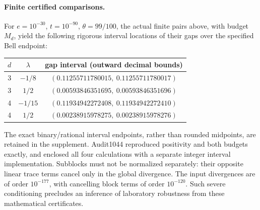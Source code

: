 \paragraph{Finite certified comparisons.}
For \(e=10^{-30}\), \(t=10^{-90}\), \(\theta=99/100\), the actual finite pairs above, with budget \(M_d\), yield the following rigorous interval locations of their gaps over the specified Bell endpoint:
\begin{center}
\begin{tabular}{ccc}
\toprule
\(d\)&\(\lambda\)&gap interval (outward decimal bounds)\\
\midrule
3&\(-1/8\)&\((0.11255711780015,\ 0.11255711780017)\)\\
3&\(1/2\)&\((0.00593846351695,\ 0.00593846351696)\)\\
4&\(-1/15\)&\((0.11934942272408,\ 0.11934942272410)\)\\
4&\(1/2\)&\((0.00238915978275,\ 0.00238915978276)\)\\
\bottomrule
\end{tabular}
\end{center}
The exact binary/rational interval endpoints, rather than rounded midpoints, are retained in the supplement. Audit1044 reproduced positivity and both budgets exactly, and enclosed all four calculations with a separate integer interval implementation. Subblocks must not be normalized separately: their opposite linear trace terms cancel only in the global divergence. The input divergences are of order \(10^{-177}\), with cancelling block terms of order \(10^{-120}\). Such severe conditioning precludes an inference of laboratory robustness from these mathematical certificates.

